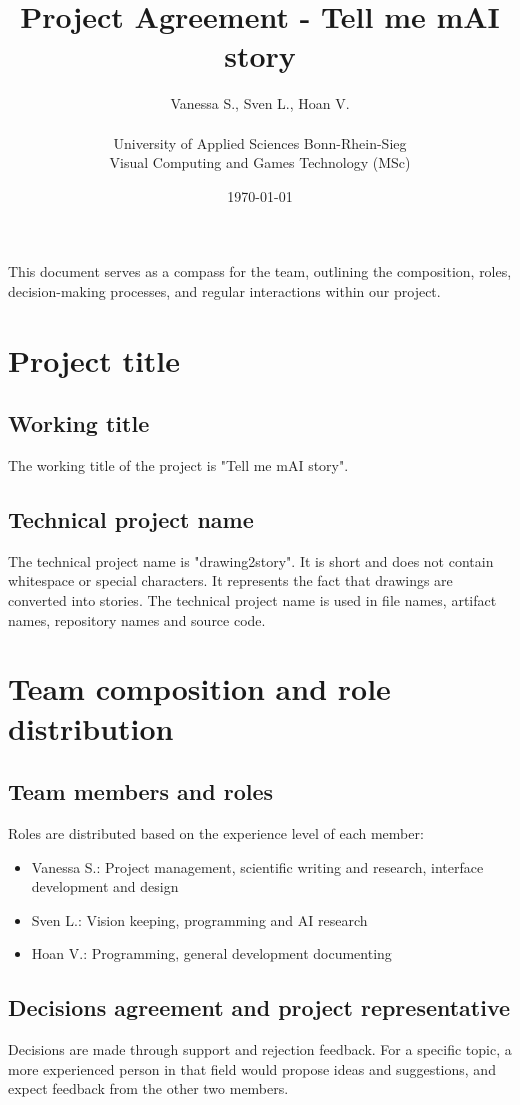 \documentclass{article}
\title{Project Agreement - Tell me mAI story}
\author{Vanessa S., Sven L., Hoan V. \\\\ University of Applied Sciences Bonn-Rhein-Sieg \\ Visual Computing and Games Technology (MSc)}
\date{\today}
\begin{document}
\maketitle

This document serves as a compass for the team, outlining the composition, roles, decision-making processes, and regular interactions within our project.

\section{Project title}
\subsection{Working title}
The working title of the project is "Tell me mAI story".
\subsection{Technical project name}
The technical project name is "drawing2story".
It is short and does not contain whitespace or special characters.
It represents the fact that drawings are converted into stories.
The technical project name is used in file names, artifact names, repository names and source code.

\section{Team composition and role distribution}
\subsection{Team members and roles}
Roles are distributed based on the experience level of each member: 
\begin{itemize}
    \item Vanessa S.: Project management, scientific writing and research, interface development and design
    \item Sven L.: Vision keeping, programming and AI research
    \item Hoan V.: Programming, general development documenting
\end{itemize}

\subsection{Decisions agreement and project representative}
Decisions are made through support and rejection feedback.
For a specific topic, a more experienced person in that field would propose ideas and suggestions, and expect feedback from the other two members. \\
\end{document}
